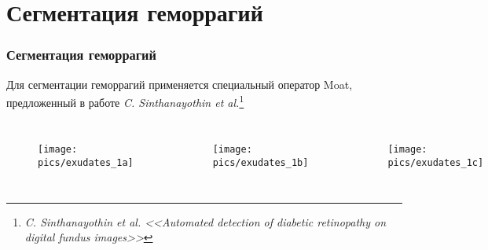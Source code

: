 \documentclass{beamer}
\let\oldfootnote\footnote
\renewcommand\footnote[1][]{\oldfootnote[frame,#1]}
\begin{document}
\section{Сегментация геморрагий}

\begin{frame}
	\frametitle{Сегментация геморрагий}
	
	Для сегментации геморрагий применяется специальный оператор Moat, предложенный в работе \textit{C. Sinthanayothin et al.}\footnote{\textit{C. Sinthanayothin et al. <<Automated detection of diabetic retinopathy on digital fundus images>>}}
	\begin{columns}[c]
		\begin{figure}
			\centering
			\texttt{[image: pics/exudates\_1a]}
			\label{fig:exudates_1a}
		\end{figure}
		
		\begin{figure}
			\centering
			\texttt{[image: pics/exudates\_1b]}
			\label{fig:exudates_1b}
		\end{figure}
		
		\begin{figure}
			\centering
			\texttt{[image: pics/exudates\_1c]}
			\label{fig:exudates_1c}
		\end{figure}
		
	\end{columns}
\end{frame}

\end{document}
